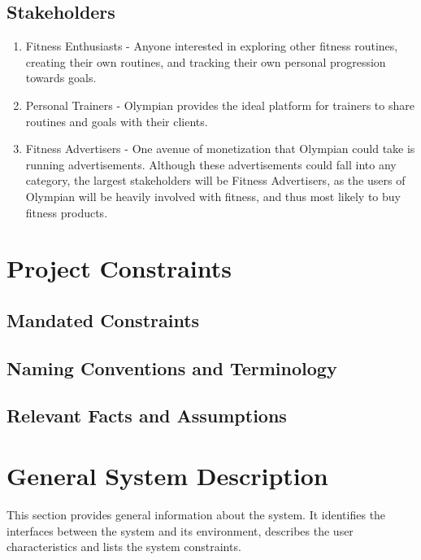 \documentclass[12pt]{article}
\begin{document}
	\subsection{Stakeholders}
	\begin{enumerate}
		\item Fitness Enthusiasts - Anyone interested in exploring other fitness
		routines, creating their own routines, and tracking their own personal
		progression towards goals.
		\item Personal Trainers - Olympian provides the ideal platform for trainers to
		share routines and goals with their clients.
		\item Fitness Advertisers - One avenue of monetization that Olympian could take
		is running advertisements. Although these advertisements could fall into any
		category, the largest stakeholders will be Fitness Advertisers,
		as the users of Olympian will be heavily involved with fitness, and thus most
		likely to buy fitness products.
	\end{enumerate} 
	
	\section{Project Constraints}
	\subsection{Mandated Constraints} 
	\subsection{Naming Conventions and Terminology}
	\subsection{Relevant Facts and Assumptions}
	
	\section{General System Description}
	
	This section provides general information about the system.  It identifies the
	interfaces between the system and its environment, describes the user
	characteristics and lists the system constraints.  
	
	
\end{document}
